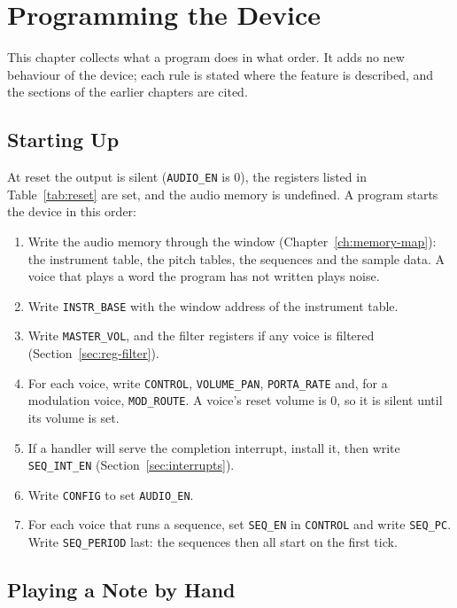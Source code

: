 \chapter{Programming the Device}
\label{ch:programming}

This chapter collects what a program does in what order. It adds no new behaviour of the device; each rule is stated
where the feature is described, and the sections of the earlier chapters are cited.

\section{Starting Up}
\label{sec:startup}

At reset the output is silent (\texttt{AUDIO\_EN} is 0), the registers listed in Table~\ref{tab:reset} are set, and the
audio memory is undefined. A program starts the device in this order:

\begin{enumerate}
	\item Write the audio memory through the window (Chapter~\ref{ch:memory-map}): the instrument table, the pitch tables, the
	      sequences and the sample data. A voice that plays a word the program has not written plays noise.
	\item Write \texttt{INSTR\_BASE} with the window address of the instrument table.
	\item Write \texttt{MASTER\_VOL}, and the filter registers if any voice is filtered (Section~\ref{sec:reg-filter}).
	\item For each voice, write \texttt{CONTROL}, \texttt{VOLUME\_PAN}, \texttt{PORTA\_RATE} and, for a modulation voice,
	      \texttt{MOD\_ROUTE}. A voice's reset volume is 0, so it is silent until its volume is set.
	\item If a handler will serve the completion interrupt, install it, then write \texttt{SEQ\_INT\_EN}
	      (Section~\ref{sec:interrupts}).
	\item Write \texttt{CONFIG} to set \texttt{AUDIO\_EN}.
	\item For each voice that runs a sequence, set \texttt{SEQ\_EN} in \texttt{CONTROL} and write \texttt{SEQ\_PC}. Write
	      \texttt{SEQ\_PERIOD} last: the sequences then all start on the first tick.
\end{enumerate}

\section{Playing a Note by Hand}


